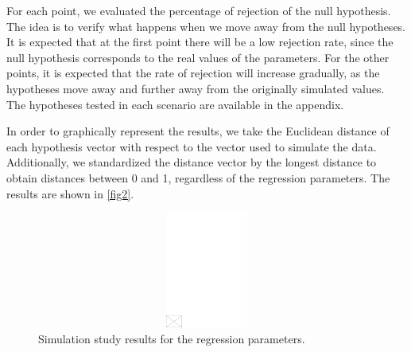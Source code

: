 \documentclass[AMA,STIX1COL]{WileyNJD-v2}
\begin{document}
For each point, we evaluated the percentage of rejection of the null hypothesis. The idea is to verify what happens when we move away from the null hypotheses. It is expected that at the first point there will be a low rejection rate, since the null hypothesis corresponds to the real values of the parameters. For the other points, it is expected that the rate of rejection will increase gradually, as the hypotheses move away and further away from the originally simulated values. The hypotheses tested in each scenario are available in the appendix.
 
In order to graphically represent the results, we take the Euclidean distance of each hypothesis vector with respect to the vector used to simulate the data. Additionally, we standardized the distance vector by the longest distance to obtain distances between 0 and 1, regardless of the regression parameters. The results are shown in \autoref{fig2}.

\begin{figure}[h]
\centerline{\includegraphics[width=342pt,height=9pc,draft]{empty}}
\caption{Simulation study results for the regression parameters.\label{fig2}}
\end{figure}
\end{document}
